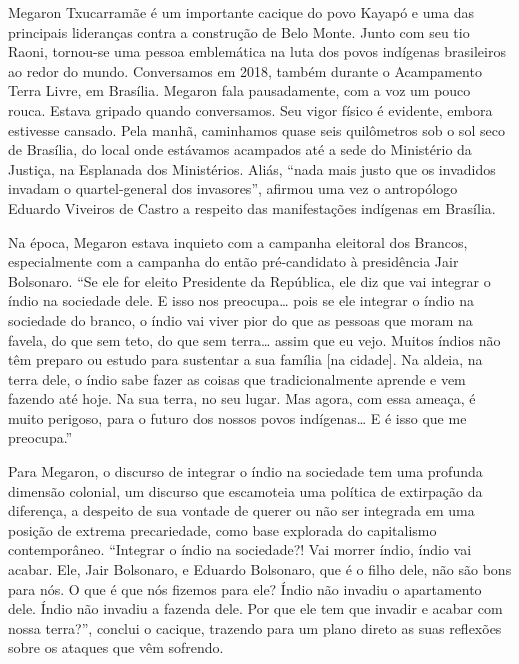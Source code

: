 Megaron Txucarramãe é um importante cacique do povo Kayapó e uma das
principais lideranças contra a construção de Belo Monte. Junto com seu
tio Raoni, tornou-se uma pessoa emblemática na luta dos povos indígenas
brasileiros ao redor do mundo. Conversamos em 2018, também durante o
Acampamento Terra Livre, em Brasília. Megaron fala pausadamente, com a
voz um pouco rouca. Estava gripado quando conversamos. Seu vigor físico
é evidente, embora estivesse cansado. Pela manhã, caminhamos quase seis
quilômetros sob o sol seco de Brasília, do local onde estávamos
acampados até a sede do Ministério da Justiça, na Esplanada dos
Ministérios. Aliás, ``nada mais justo que os invadidos invadam o
quartel-general dos invasores'', afirmou uma vez o antropólogo Eduardo
Viveiros de Castro a respeito das manifestações indígenas em Brasília.

Na época, Megaron estava inquieto com a campanha eleitoral dos Brancos,
especialmente com a campanha do então pré-candidato à presidência Jair
Bolsonaro. ``Se ele for eleito Presidente da República, ele diz que vai
integrar o índio na sociedade dele. E isso nos preocupa\ldots{} pois se
ele integrar o índio na sociedade do branco, o índio vai viver pior do
que as pessoas que moram na favela, do que sem teto, do que sem
terra\ldots{} assim que eu vejo. Muitos índios não têm preparo ou estudo
para sustentar a sua família {[}na cidade{]}. Na aldeia, na terra dele,
o índio sabe fazer as coisas que tradicionalmente aprende e vem fazendo
até hoje. Na sua terra, no seu lugar. Mas agora, com essa ameaça, é
muito perigoso, para o futuro dos nossos povos indígenas\ldots{} E é
isso que me preocupa.''

Para Megaron, o discurso de integrar o índio na sociedade tem uma
profunda dimensão colonial, um discurso que escamoteia uma política de
extirpação da diferença, a despeito de sua vontade de querer ou não ser
integrada em uma posição de extrema precariedade, como base explorada do
capitalismo contemporâneo. ``Integrar o índio na sociedade?! Vai morrer
índio, índio vai acabar. Ele, Jair Bolsonaro, e Eduardo Bolsonaro, que é
o filho dele, não são bons para nós. O que é que nós fizemos para ele?
Índio não invadiu o apartamento dele. Índio não invadiu a fazenda dele.
Por que ele tem que invadir e acabar com nossa terra?'', conclui o
cacique, trazendo para um plano direto as suas reflexões sobre os
ataques que vêm sofrendo.

